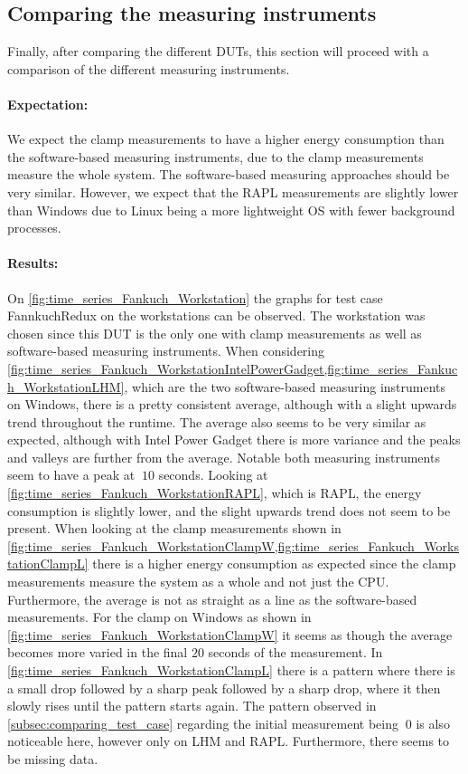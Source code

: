 
\subsection{Comparing the measuring instruments}
Finally, after comparing the different DUTs, this section will proceed with a comparison of the different measuring instruments.

\paragraph{Expectation:}
We expect the clamp measurements to have a higher energy consumption than the software-based measuring instruments, due to the clamp measurements measure the whole system. The software-based measuring approaches should be very similar. However, we expect that the RAPL measurements are slightly lower than Windows due to Linux being a more lightweight OS with fewer background processes.

\paragraph{Results:}
On \cref{fig:time_series_Fankuch_Workstation} the graphs for test case FannkuchRedux on the workstations can be observed. The workstation was chosen since this DUT is the only one with clamp measurements as well as software-based measuring instruments. When considering \cref{fig:time_series_Fankuch_WorkstationIntelPowerGadget,fig:time_series_Fankuch_WorkstationLHM}, which are the two software-based measuring instruments on Windows, there is a pretty consistent average, although with a slight upwards trend throughout the runtime. The average also seems to be very similar as expected, although with Intel Power Gadget there is more variance and the peaks and valleys are further from the average. Notable both measuring instruments seem to have a peak at $~10$ seconds. Looking at \cref{fig:time_series_Fankuch_WorkstationRAPL}, which is RAPL, the energy consumption is slightly lower, and the slight upwards trend does not seem to be present. When looking at the clamp measurements shown in \cref{fig:time_series_Fankuch_WorkstationClampW,fig:time_series_Fankuch_WorkstationClampL} there is a higher energy consumption as expected since the clamp measurements measure the system as a whole and not just the CPU. Furthermore, the average is not as straight as a line as the software-based measurements. For the clamp on Windows as shown in \cref{fig:time_series_Fankuch_WorkstationClampW} it seems as though the average becomes more varied in the final $20$ seconds of the measurement. In \cref{fig:time_series_Fankuch_WorkstationClampL} there is a pattern where there is a small drop followed by a sharp peak followed by a sharp drop, where it then slowly rises until the pattern starts again. The pattern observed in \cref{subsec:comparing_test_case} regarding the initial measurement being $~0$ is also noticeable here, however only on LHM and RAPL. Furthermore, there seems to be missing data.


